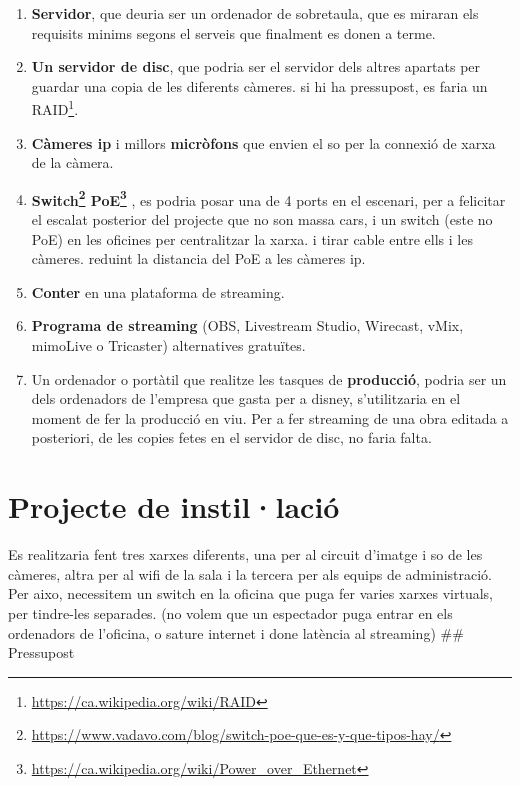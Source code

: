 \documentclass[
  10pt,
]{book}
\DeclareRobustCommand{\href}[2]{#2\footnote{\url{#1}}}
\begin{document}
\begin{enumerate}
\def\labelenumi{\arabic{enumi}.}
\item
  \textbf{Servidor}, que deuria ser un ordenador de sobretaula, que es miraran els requisits minims segons el serveis que finalment es donen a terme.
\item
  \textbf{Un servidor de disc}, que podria ser el servidor dels altres apartats per guardar una copia de les diferents càmeres. si hi ha pressupost, es faria un \href{https://ca.wikipedia.org/wiki/RAID}{RAID}.
\item
  \textbf{Càmeres ip} i millors \textbf{micròfons} que envien el so per la connexió de xarxa de la càmera.
\item
  \textbf{\href{https://www.vadavo.com/blog/switch-poe-que-es-y-que-tipos-hay/}{Switch} \href{https://ca.wikipedia.org/wiki/Power_over_Ethernet}{PoE}} , es podria posar una de 4 ports en el escenari, per a felicitar el escalat posterior del projecte que no son massa cars, i un switch (este no PoE) en les oficines per centralitzar la xarxa. i tirar cable entre ells i les càmeres. reduint la distancia del PoE a les càmeres ip.
\item
  \textbf{Conter} en una plataforma de streaming.
\item
  \textbf{Programa de streaming} (OBS, Livestream Studio, Wirecast, vMix, mimoLive o Tricaster) alternatives gratuïtes.
\item
  Un ordenador o portàtil que realitze les tasques de \textbf{producció}, podria ser un dels ordenadors de l'empresa que gasta per a disney, s'utilitzaria en el moment de fer la producció en viu. Per a fer streaming de una obra editada a posteriori, de les copies fetes en el servidor de disc, no faria falta.
\end{enumerate}

\hypertarget{projecte-de-instillaciuxf3}{%
\section{Projecte de instil·lació}\label{projecte-de-instillaciuxf3}}

Es realitzaria fent tres xarxes diferents, una per al circuit d'imatge i so de les càmeres, altra per al wifi de la sala i la tercera per als equips de administració. Per aixo, necessitem un switch en la oficina que puga fer varies xarxes virtuals, per tindre-les separades. (no volem que un espectador puga entrar en els ordenadors de l'oficina, o sature internet i done latència al streaming)
\#\# Pressupost
\end{document}
